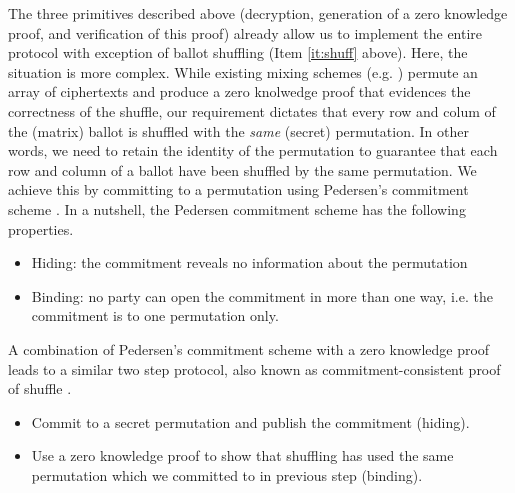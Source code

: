 The three primitives described above (decryption, generation of a
zero knowledge proof, and verification of this proof) already allow
us  to implement the entire protocol with exception of ballot
shuffling (Item \ref{it:shuff} above).  Here, the situation is more
complex. While existing mixing schemes (e.g. \citep{Bayer:2012:EZK}) permute 
an array of ciphertexts and produce a zero knolwedge proof that
evidences the correctness of the shuffle, our requirement dictates
that every row and colum of the (matrix) ballot is
shuffled with the \emph{same} (secret) permutation.  In other words,
we need to retain the identity of the permutation to guarantee that
each row and column of a ballot have been shuffled by the same
permutation.
We achieve this by
committing to a permutation using Pedersen's commitment scheme
\citep{Pederson}.
In a nutshell, the Pedersen commitment scheme has the following properties. 
\begin{itemize}
\item Hiding: the commitment reveals no information about the
permutation
\item Binding: no party can open the commitment in more  
	 	than one way, i.e. the commitment is to one permutation only. 
\end{itemize}

\noindent
A combination of Pedersen's commitment scheme 
with a zero knowledge proof leads to a similar two step protocol, also known 
as commitment-consistent proof of shuffle \citep{Wikstrom:2009:CPS}.

\begin{itemize}
\item Commit to a secret permutation and publish the commitment (hiding).
\item Use a zero knowledge proof to show that shuffling has used 
      the same permutation which we committed to in previous step (binding).
\end{itemize}  

